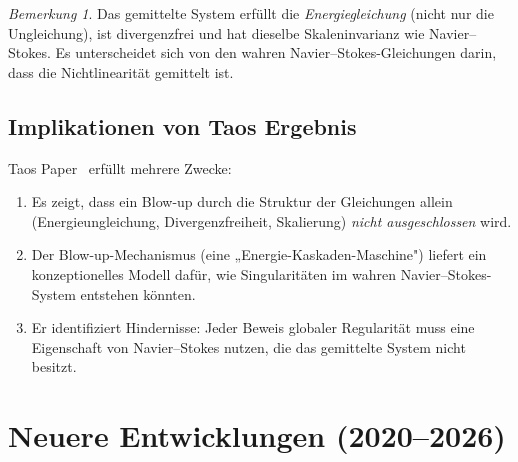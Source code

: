 \documentclass[12pt,a4paper]{article}
\theoremstyle{remark}
\newtheorem{remark}[theorem]{Bemerkung}
\begin{document}
\begin{remark}
  Das gemittelte System erfüllt die \emph{Energiegleichung} (nicht nur die Ungleichung),
  ist divergenzfrei und hat dieselbe Skaleninvarianz wie Navier--Stokes. Es unterscheidet
  sich von den wahren Navier--Stokes-Gleichungen darin, dass die Nichtlinearität gemittelt
  ist.
\end{remark}

\subsection{Implikationen von Taos Ergebnis}

Taos Paper~\cite{Tao2016} erfüllt mehrere Zwecke:
\begin{enumerate}[nosep]
  \item Es zeigt, dass ein Blow-up durch die Struktur der Gleichungen allein
    (Energieungleichung, Divergenzfreiheit, Skalierung) \emph{nicht ausgeschlossen} wird.
  \item Der Blow-up-Mechanismus (eine „Energie-Kaskaden-Maschine") liefert ein
    konzeptionelles Modell dafür, wie Singularitäten im wahren Navier--Stokes-System
    entstehen könnten.
  \item Er identifiziert Hindernisse: Jeder Beweis globaler Regularität muss eine
    Eigenschaft von Navier--Stokes nutzen, die das gemittelte System nicht besitzt.
\end{enumerate}

\section{Neuere Entwicklungen (2020--2026)}
\end{document}
